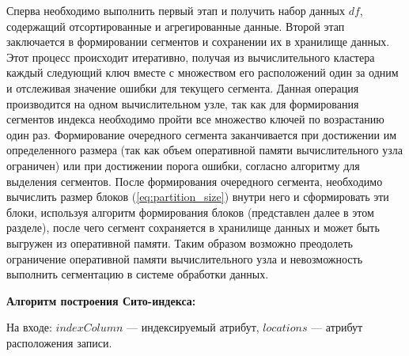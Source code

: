 Сперва необходимо выполнить первый этап и получить набор данных $df$, содержащий отсортированные и агрегированные данные. Второй этап заключается в формировании сегментов и сохранении их в хранилище данных. Этот процесс происходит итеративно, получая из вычислительного кластера каждый следующий ключ вместе с множеством его расположений один за одним и отслеживая значение ошибки для текущего сегмента. Данная операция производится на одном вычислительном узле, так как для формирования сегментов индекса необходимо пройти все множество ключей по возрастанию один раз. Формирование очередного сегмента заканчивается при достижении им определенного размера (так как объем оперативной памяти вычислительного узла ограничен) или при достижении порога ошибки, согласно алгоритму для выделения сегментов. После формирования очередного сегмента, необходимо вычислить размер блоков (\ref{eq:partition_size}) внутри него и сформировать эти блоки, используя алгоритм формирования блоков (представлен далее в этом разделе), после чего сегмент сохраняется в хранилище данных и может быть выгружен из оперативной памяти. Таким образом возможно преодолеть ограничение оперативной памяти вычислительного узла и невозможность выполнить сегментацию в системе обработки данных.

\textbf{Алгоритм построения Сито-индекса:}

На входе: $indexColumn$ --- индексируемый атрибут, $locations$ --- атрибут расположения записи.

